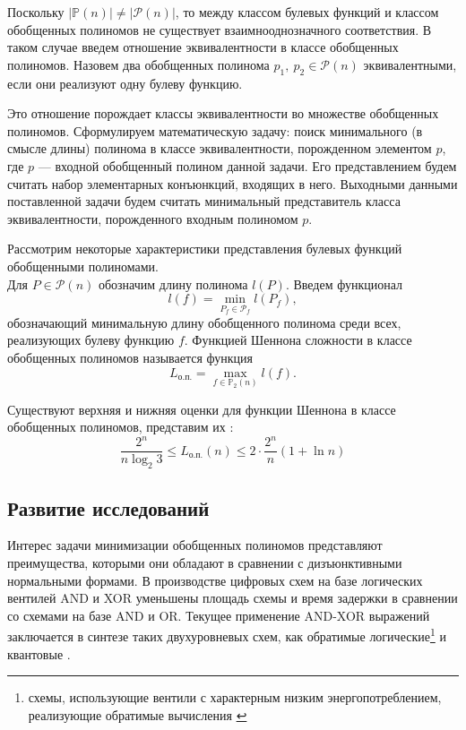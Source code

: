 \documentclass[a4paper,12pt,titlepage]{article}
\begin{document}
Поскольку $ \left| \mathbb{P}(n) \right| \ne \left| \mathcal{P}(n) \right| $, то между классом булевых функций и классом обобщенных полиномов не существует взаимнооднозначного соответствия. В таком случае введем отношение эквивалентности в классе обобщенных полиномов. Назовем два обобщенных полинома $ p_1,\ p_2 \in \mathcal{P}(n) $ эквивалентными, если они реализуют одну булеву функцию.

Это отношение порождает классы эквивалентности во множестве обобщенных полиномов. Сформулируем математическую задачу: поиск минимального (в смысле длины) полинома в классе эквивалентности, порожденном элементом $ p $, где $ p $ --- входной обобщенный полином данной задачи. Его представлением будем считать набор элементарных конъюнкций, входящих в него. Выходными данными поставленной задачи будем считать минимальный представитель класса эквивалентности, порожденного входным полиномом $ p $.

Рассмотрим некоторые характеристики представления булевых функций обобщенными полиномами.\\
Для $ P \in \mathcal{P}(n) $ обозначим длину полинома $ l(P) $. Введем функционал
$$ l(f) = \min\limits_{P_f \in \mathcal{P}_f} l(P_f), $$
обозначающий минимальную длину обобщенного полинома среди всех, реализующих булеву функцию $ f $. Функцией Шеннона сложности в классе обобщенных полиномов называется функция
$$ L_\text{о.п.} = \max\limits_{f \in \mathbb{P}_2(n)} l(f). $$

Существуют верхняя и нижняя оценки для функции Шеннона в классе обобщенных полиномов, представим их \cite{selezn}:
$$ \frac{2^n}{n \log_2 3} \le L_\text{о.п.}(n) \le 2 \cdot \frac{2^n}{n} (1 + \ln n) $$

\subsection{Развитие исследований}

Интерес задачи минимизации обобщенных полиномов представляют преимущества, которыми они обладают в сравнении с дизъюнктивными нормальными формами. В производстве цифровых схем на базе логических вентилей \textsc{AND} и \textsc{XOR} уменьшены площадь схемы и время задержки \cite{delay} в сравнении со схемами на базе \textsc{AND} и \textsc{OR}. Текущее применение \textsc{AND-XOR} выражений заключается в синтезе таких двухуровневых схем, как обратимые логические\footnote{схемы, использующие вентили с характерным низким энергопотреблением, реализующие обратимые вычисления \cite{revsynth}} \cite{reversible} и квантовые \cite{quantum}.
\end{document}
